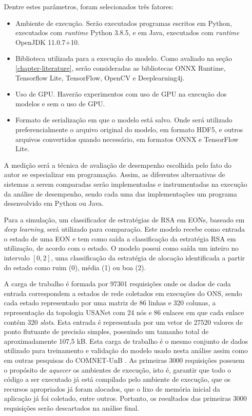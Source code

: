 Dentre estes parâmetros, foram selecionados três fatores:

\begin{itemize}
  \item Ambiente de execução. Serão executados programas escritos em Python, executados com \textit{runtime} Python 3.8.5, e em Java, executados com \textit{runtime} OpenJDK 11.0.7+10.
  \item Biblioteca utilizada para a execução do modelo. Como avaliado na seção \ref{chapter-literature}, serão consideradas as bibliotecas ONNX Runtime, Tensorflow Lite, TensorFlow, OpenCV e Deeplearning4j.
  \item Uso de GPU. Haverão experimentos com uso de GPU na execução dos modelos e sem o uso de GPU.
  \item Formato de serialização em que o modelo está salvo. Onde será utilizado preferencialmente o arquivo original do modelo, em formato HDF5, e outros arquivos convertidos quando necessário, em formatos ONNX e TensorFlow Lite.
\end{itemize}

A medição será a técnica de avaliação de desempenho escolhida pelo fato do autor se especializar em programação. Assim, as diferentes alternativas de sistemas a serem comparadas serão implementadas e instrumentadas na execução da análise de desempenho, sendo cada uma das implementações um programa desenvolvido em Python ou Java.

Para a simulação, um classificador de estratégias de RSA em EONs, baseado em \textit{deep learning}, será utilizado para comparação. Este modelo recebe como entrada o estado de uma EON e tem como saída a classificação da estratégia RSA em utilização, de acordo com o estado. O modelo possui como saída um inteiro no intervalo $[0, 2]$, uma classificação da estratégia de alocação identificada a partir do estado como ruim (0), média (1) ou boa (2).

A carga de trabalho é formada por 97301 requisições onde os dados de cada entrada correspondem a estados de rede coletados em execuções do ONS, sendo cada estado representado por uma matriz de 86 linhas e 320 colunas, a representação da topologia USANet com 24 nós e 86 enlaces em que cada enlace contém 320 \textit{slots}. Esta entrada é representada por um vetor de 27520 valores de ponto flutuante de precisão simples, possuindo um tamanho total de aproximadamente 107,5 kB. Esta carga de trabalho é o mesmo conjunto de dados utilizado para treinamento e validação do modelo usado nesta análise assim como em outras pesquisas do \acrfull{COMNET-UnB} \cite{eon_ml_classifier_2020}. As primeiras 3000 requisições possuem o propósito de \textit{aquecer} os ambientes de execução, isto é, garantir que todo o código a ser executado já está compilado pelo ambiente de execução, que os recursos apropriados já foram alocados, que o lixo de memória inicial da aplicação já foi coletado, entre outros. Portanto, os resultados das primeiras 3000 requisições serão descartados na análise final.

